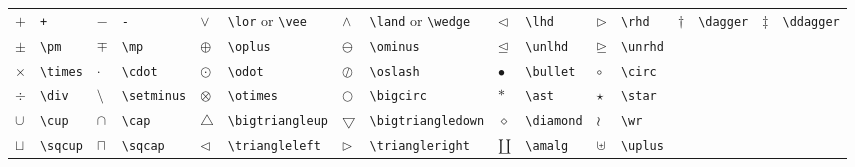 \documentclass[10pt, english]{article}
\begin{document}
	\begin{center}
		\scriptsize
	\begin{tabular}{ll|ll|ll|ll|ll|ll|ll|ll}
		$+$ & \verb|+| & $-$ & \verb|-| & $\lor$ & \verb|\lor| or \verb|\vee| & $\land$ & \verb|\land| or \verb|\wedge| & $\lhd$ & \verb|\lhd| & $\rhd$ & \verb|\rhd| & $\dagger$ & \verb|\dagger| & $\ddagger$ & \verb|\ddagger| \\
		$\pm$ & \verb|\pm| & $\mp$ & \verb|\mp| & $\oplus$ & \verb|\oplus| & $\ominus$ & \verb|\ominus| & $\unlhd$ & \verb|\unlhd| & $\unrhd$ & \verb|\unrhd| \\
		$\times$ & \verb|\times| & $\cdot$ & \verb|\cdot| & $\odot$ & \verb|\odot| & $\oslash$ & \verb|\oslash| & $\bullet$ & \verb|\bullet| & $\circ$ & \verb|\circ| \\
		$\div$ & \verb|\div| & $\setminus$ & \verb|\setminus| & $\otimes$ & \verb|\otimes| & $\bigcirc$ & \verb|\bigcirc| & $\ast$ & \verb|\ast| & $\star$ & \verb|\star| \\
		$\cup$ & \verb|\cup| & $\cap$ & \verb|\cap| & $\bigtriangleup$ & \verb|\bigtriangleup| & $\bigtriangledown$ & \verb|\bigtriangledown| & $\diamond$ & \verb|\diamond| & $\wr$ & \verb|\wr| \\
		$\sqcup$ & \verb|\sqcup| & $\sqcap$ & \verb|\sqcap| & $\triangleleft$ & \verb|\triangleleft| & $\triangleright$ & \verb|\triangleright| & $\amalg$ & \verb|\amalg| & $\uplus$ & \verb|\uplus| \\
	\end{tabular}
	\end{center}
\end{document}
